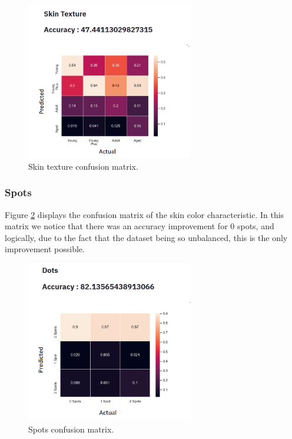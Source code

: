 \documentclass[12pt,a4paper,oneside]{memoir}
\begin{document}
\begin{figure}[H]
\centering
\includegraphics[width=0.65\textwidth]{images/skin_star_texture.png}
\caption{Skin texture confusion matrix.}
\centering
\label{fig:skin_star_texture}
\end{figure}



\subsubsection{Spots}
Figure \ref{fig:dots} displays the confusion matrix of the skin color characteristic. In this matrix we notice that there was an accuracy improvement for 0 spots, and logically, due to the fact that the dataset being so unbalanced, this is the only improvement possible.

\begin{figure}[H]
\centering
\includegraphics[width=0.65\textwidth]{images/dots_star.png}
\caption{Spots confusion matrix.}
\centering
\label{fig:dots}
\end{figure}
\end{document}
